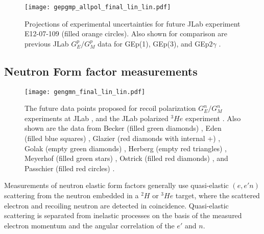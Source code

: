 \documentclass[epj]{svjour}
\begin{document}
\begin{figure}
\centering
 \texttt{[image: gepgmp\_allpol\_final\_lin\_lin.pdf]}
\caption{Projections of experimental uncertainties for future JLab experiment E12-07-109 \protect\cite{PR12-07-109} (filled orange circles). 
Also shown for comparison are previous JLab $G^p_E/G^p_M$ data for 
GEp(1), GEp(3), and GEp$2\gamma$ \cite{Jones:1999rz,Punjabi:2005wq,Gayou:2001qd,
Puckett:2011xg,Puckett:2010ac,Puckett:2017flj,Meziane:2010xc}. }
\label{fig:Gep} 
\end{figure}

 
\subsection{Neutron Form factor measurements}
\begin{figure}
\centering
\texttt{[image: gengmn\_final\_lin\_lin.pdf]}
\caption{The future data points proposed for recoil polarization $G^n_{E}/G_M^n$ experiments at JLab \protect\cite{PR12-11-009,PR12-17-004},  
and the JLab polarized $^3\!He$ experiment  \protect\cite{PR12-09-016}. 
Also shown are the 
data from Becker (filled green diamonds) \protect\cite{Becker:1999tw},
Eden (filled blue squares) \protect\cite{Eden:1994ji},
Glazier (red diamonds with internal +) \protect\cite{Glazier:2004ny},
Golak (empty green diamonds) \protect\cite{Golak:2000nt},
Herberg (empty red triangles) \protect\cite{Herberg:1999ud},
Meyerhof (filled green stars) \protect\cite{Meyerhoff:1994ev},
Ostrick (filled red diamonds) \protect\cite{Ostrick:1999xa}, and
Passchier (filled red circles) \protect\cite{Passchier:1999ju}. }
\label{fig:Gen} 
\end{figure}
Measurements of neutron elastic form factors generally use quasi-elastic 
$(e,e'n)$ scattering from the neutron embedded in a $^2\!H$
or $^3\!He $ target, where the scattered electron and recoiling
neutron are detected in coincidence. Quasi-elastic 
 scattering
is separated from inelastic processes on the basis of the measured
electron momentum and the angular correlation of the $e'$ and $n$.
\end{document}
